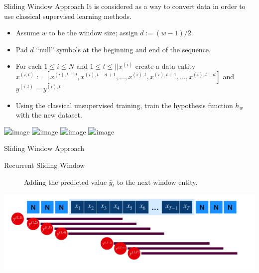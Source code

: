 \documentclass{beamer}
\begin{document}
	\begin{frame}{Sliding Window Approach}
		It is considered as a way to convert data in order to use classical supervised learning methods. 
		\begin{itemize}
			\item<1-> Assume $w$ to be the window size; assign $d:= (w - 1)/2$. 
			\item<2-> Pad $d$ ``null'' symbols at the beginning and end of the sequence.
			\item<3-> For each $1 \le i \le N$ and $1 \le t \le || x^{(i)}$ create a data entity $x^{(i , t)} := [x^{(i), t - d}, x^{(i), t - d + 1}, ... ,x^{(i), t} , x^{(i), t + 1} , ... , x^{(i), t + d}]$ and $y^{(i , t)} = y^{(i) , t}$
			\item<4-> Using the classical unsupervised training, train the hypothesis function $h_w$ with the new dataset.
			
		\end{itemize}
		\begin{center}
			\includegraphics<1>[scale=0.3]{Pics/revolving-window1.png}
			\includegraphics<2>[scale=0.3]{Pics/revolving-window2.png}
			\includegraphics<3>[scale=0.3]{Pics/revolving-window4.png}
			\includegraphics<4>[scale=0.3]{Pics/revolving-window4.png}
		\end{center}
	\end{frame}
	\begin{frame}{Sliding Window Approach}
		\begin{description}
			\item[Recurrent Sliding Window] Adding the predicted value $\bar{y}_t$ to the next window entity.
		\end{description}
		\begin{center}
			\includegraphics[scale=0.4]{Pics/rec-window.png}
		\end{center}
	\end{frame}

	
%		
\end{document}
